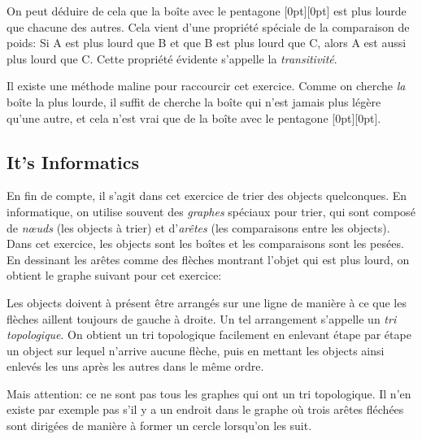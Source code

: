 \documentclass[a4paper,11pt]{report}
\newcommand{\taskGraphicsFolder}{..}
\begin{document}
On peut déduire de cela que la boîte avec le pentagone \raisebox{-0.5ex}[0pt][0pt]{} est plus lourde que chacune des autres. Cela vient d’une propriété spéciale de la comparaison de poids: Si A est plus lourd que B et que B est plus lourd que C, alors A est aussi plus lourd que C. Cette propriété évidente s’appelle la \emph{transitivité}.

Il existe une méthode maline pour raccourcir cet exercice. Comme on cherche \emph{la} boîte la plus lourde, il suffit de cherche la boîte qui n’est jamais plus légère qu’une autre, et cela n’est vrai que de la boîte avec le pentagone \raisebox{-0.5ex}[0pt][0pt]{}.


\subsection*{It’s Informatics}

En fin de compte, il s’agit dans cet exercice de trier des objects quelconques. En informatique, on utilise souvent des \emph{graphes} spéciaux pour trier, qui sont composé de \emph{nœuds} (les objects à trier) et d’\emph{arêtes} (les comparaisons entre les objects). Dans cet exercice, les objects sont les boîtes et les comparaisons sont les pesées. En dessinant les arêtes comme des flèches montrant l’objet qui est plus lourd, on obtient le graphe suivant pour cet exercice:

{\centering%
\par}

Les objects doivent à présent être arrangés sur une ligne de manière à ce que les flèches aillent toujours de gauche à droite. Un tel arrangement s’appelle un \emph{tri topologique}. On obtient un tri topologique facilement en enlevant étape par étape un object sur lequel n’arrive aucune flèche, puis en mettant les objects ainsi enlevés les uns après les autres dans le même ordre.

Mais attention: ce ne sont pas tous les graphes qui ont un tri topologique. Il n’en existe par exemple pas s’il y a un endroit dans le graphe où trois arêtes fléchées sont dirigées de manière à former un cercle lorsqu’on les suit.
\end{document}
